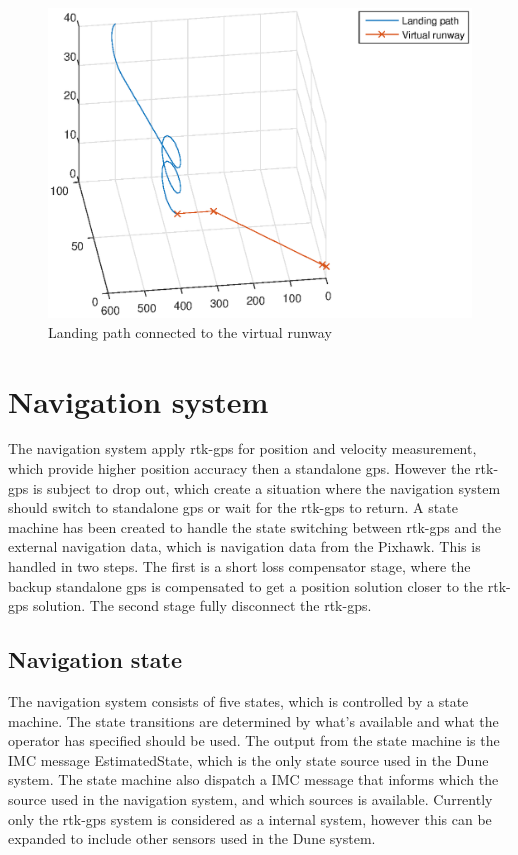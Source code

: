 \begin{figure}[H]
	\centering
		\includegraphics[width=1\textwidth]{figs/SysPlot/LandingPath.eps}
		\caption{Landing path connected to the virtual runway}
		\label{Fig:LandingPath}
\end{figure}

\section{Navigation system}
The navigation system apply \gls{rtk-gps} for position and velocity measurement, which provide higher position accuracy then a standalone \gls{gps}. However the \gls{rtk-gps} is subject to drop out, which create a situation where the navigation system should switch to standalone \gls{gps} or wait for the \gls{rtk-gps} to return. A state machine has been created to handle the state switching between \gls{rtk-gps} and the external navigation data, which is navigation data from the Pixhawk. This is handled in two steps. The first is a short loss compensator stage, where the backup standalone \gls{gps} is compensated to get a position solution closer to the \gls{rtk-gps} solution. The second stage fully disconnect the \gls{rtk-gps}.
\subsection{Navigation state}\label{S:NavState}
The navigation system consists of five states, which is controlled by a state machine. The state transitions are determined by what's available and what the operator has specified should be used. The output from the state machine is the IMC message EstimatedState, which is the only state source used in the Dune system. The state machine also dispatch a IMC message that informs which the source used in the navigation system, and which sources is available. Currently only the \gls{rtk-gps} system is considered as a internal system, however this can be expanded to include other sensors used in the Dune system.


